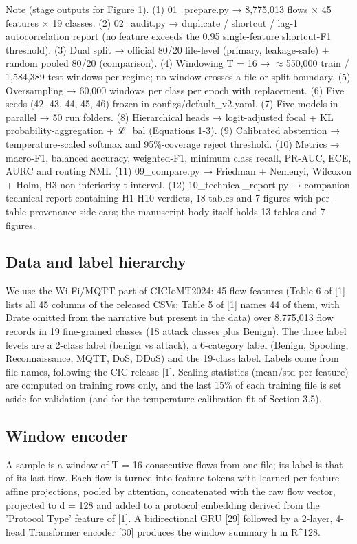 \documentclass[11pt]{article}
\begin{document}
Note (stage outputs for Figure 1). (1) 01\_prepare.py → 8,775,013 flows × 45 features × 19 classes. (2) 02\_audit.py → duplicate / shortcut / lag-1 autocorrelation report (no feature exceeds the 0.95 single-feature shortcut-F1 threshold). (3) Dual split → official 80/20 file-level (primary, leakage-safe) + random pooled 80/20 (comparison). (4) Windowing T = 16 → $\approx$550,000 train / 1,584,389 test windows per regime; no window crosses a file or split boundary. (5) Oversampling → 60,000 windows per class per epoch with replacement. (6) Five seeds (42, 43, 44, 45, 46) frozen in configs/default\_v2.yaml. (7) Five models in parallel → 50 run folders. (8) Hierarchical heads → logit-adjusted focal + KL probability-aggregation + ℒ\_bal (Equations 1-3). (9) Calibrated abstention → temperature-scaled softmax and 95\%-coverage reject threshold. (10) Metrics → macro-F1, balanced accuracy, weighted-F1, minimum class recall, PR-AUC, ECE, AURC and routing NMI. (11) 09\_compare.py → Friedman + Nemenyi, Wilcoxon + Holm, H3 non-inferiority t-interval. (12) 10\_technical\_report.py → companion technical report containing H1-H10 verdicts, 18 tables and 7 figures with per-table provenance side-cars; the manuscript body itself holds 13 tables and 7 figures.

\subsection{Data and label hierarchy}
We use the Wi-Fi/MQTT part of CICIoMT2024: 45 flow features (Table 6 of [1] lists all 45 columns of the released CSVs; Table 5 of [1] names 44 of them, with Drate omitted from the narrative but present in the data) over 8,775,013 flow records in 19 fine-grained classes (18 attack classes plus Benign). The three label levels are a 2-class label (benign vs attack), a 6-category label (Benign, Spoofing, Reconnaissance, MQTT, DoS, DDoS) and the 19-class label. Labels come from file names, following the CIC release [1]. Scaling statistics (mean/std per feature) are computed on training rows only, and the last 15\% of each training file is set aside for validation (and for the temperature-calibration fit of Section 3.5).

\subsection{Window encoder}
A sample is a window of T = 16 consecutive flows from one file; its label is that of its last flow. Each flow is turned into feature tokens with learned per-feature affine projections, pooled by attention, concatenated with the raw flow vector, projected to d = 128 and added to a protocol embedding derived from the 'Protocol Type' feature of [1]. A bidirectional GRU [29] followed by a 2-layer, 4-head Transformer encoder [30] produces the window summary h in R\textasciicircum{}128.
\end{document}
